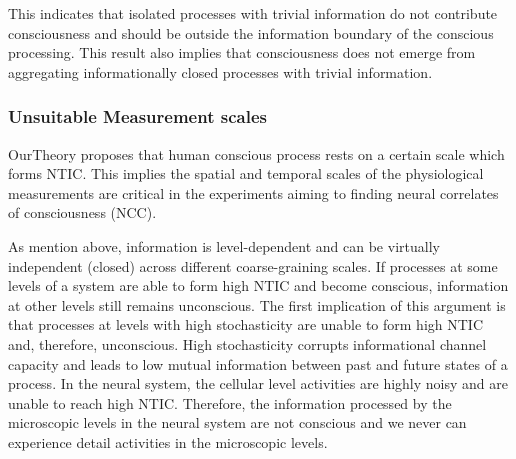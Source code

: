 \documentclass[utf8]{article}
\begin{document}
                This indicates that isolated processes with trivial information do not contribute consciousness and should be outside the information boundary of the conscious processing. This result also implies that consciousness does not emerge from aggregating informationally closed processes with trivial information. 
            
            
            
            
        
        
            \subsubsection*{Unsuitable Measurement scales }
                \ac{OurTheory} proposes that human conscious process rests on a certain scale which forms NTIC. This implies the spatial and temporal scales of the physiological measurements are critical in the experiments aiming to finding neural correlates of consciousness (NCC).
            
            
                As mention above, information is level-dependent and can be virtually independent (closed) across different coarse-graining scales. If processes at some levels of a system are able to form high NTIC and become conscious, information at other levels still remains unconscious. The first implication of this argument is that processes at levels with high stochasticity are unable to form high NTIC and, therefore, unconscious. High stochasticity corrupts informational channel capacity and leads to low mutual information between past and future states of a process. In the neural system, the cellular level activities are highly noisy and are unable to reach high NTIC. Therefore, the information processed by the microscopic levels in the neural system are not conscious and we never can experience detail activities in the microscopic levels. 
                
\end{document}
